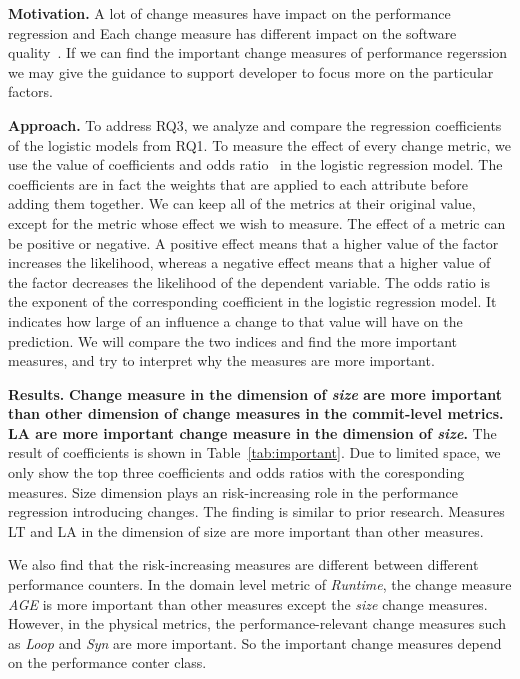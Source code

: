 \textbf{Motivation.}
A lot of change measures have impact on the performance regression and Each change measure has different impact on the software quality~\cite{emadjit}. If we can find the important change measures of performance regerssion we may give the guidance to support developer to focus more on the particular factors.

\textbf{Approach.}
To address RQ3, we analyze and compare the regression coefficients of the logistic models from RQ1. To measure the effect of every change metric, we use the value of coefficients and odds ratio~\cite{Shihab:2010} in the logistic regression model. The coefficients are in fact the weights that are applied to each attribute before adding them together. We can keep all of the metrics at their original value, except for the metric whose effect we wish to measure. %
The effect of a metric can be positive or negative. A positive effect means that a higher value of the factor increases the likelihood, whereas a negative effect means that a higher value of the factor decreases the likelihood of the dependent variable. The odds ratio is the exponent of the corresponding coefficient in the logistic regression model. It indicates how large of an influence a change to that value will have on the prediction. We will compare the two indices and find the more important measures, and try to interpret why the measures are more important.

\textbf{Results.} \textbf{Change measure in the dimension of \emph{size} are more important than other dimension of change measures in the commit-level metrics. LA are more important change measure in the dimension of \emph{size}.} The result of  coefficients is shown in Table~\ref{tab:important}. Due to limited space, we only show the top three coefficients and odds ratios with the coresponding measures. Size dimension plays an risk-increasing role in the performance regression introducing changes. The finding is similar to prior research. Measures LT and LA in the dimension of size are more important than other measures. 

We also find that  the risk-increasing measures are different between different performance counters. In the domain level metric of \emph{Runtime}, the change measure \emph{AGE} is more important than other measures except the \emph{size} change measures. However, in the physical metrics, the performance-relevant change measures such as \emph{Loop} and \emph{Syn} are more important. So the important change measures depend on the performance conter class.

